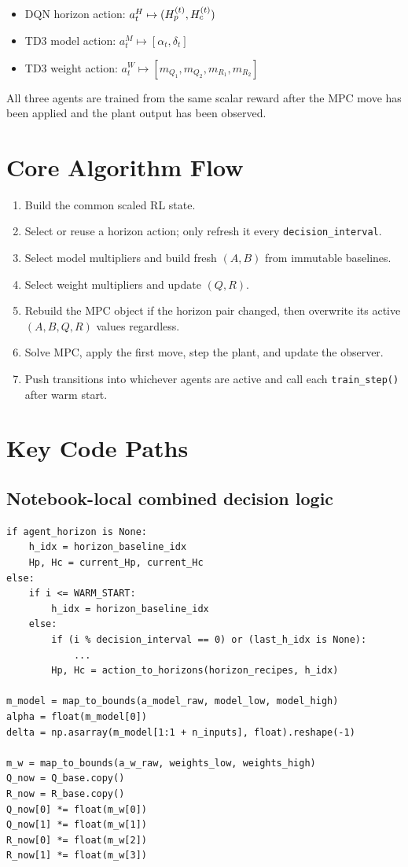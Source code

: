 \documentclass[11pt]{article}
\begin{document}
\begin{itemize}
\item DQN horizon action:
      $a_t^{H} \mapsto (H_p^{(t)},H_c^{(t)})$
\item TD3 model action:
      $a_t^{M} \mapsto [\alpha_t, \delta_t]$
\item TD3 weight action:
      $a_t^{W} \mapsto [m_{Q_1}, m_{Q_2}, m_{R_1}, m_{R_2}]$
\end{itemize}

All three agents are trained from the same scalar reward after the MPC move has
been applied and the plant output has been observed.

\section*{Core Algorithm Flow}

\begin{enumerate}
\item Build the common scaled RL state.
\item Select or reuse a horizon action; only refresh it every
      \texttt{decision\_interval}.
\item Select model multipliers and build fresh $(A, B)$ from immutable
      baselines.
\item Select weight multipliers and update $(Q, R)$.
\item Rebuild the MPC object if the horizon pair changed, then overwrite its
      active $(A, B, Q, R)$ values regardless.
\item Solve MPC, apply the first move, step the plant, and update the observer.
\item Push transitions into whichever agents are active and call each
      \texttt{train\_step()} after warm start.
\end{enumerate}

\section*{Key Code Paths}

\subsection*{Notebook-local combined decision logic}

\begin{lstlisting}
if agent_horizon is None:
    h_idx = horizon_baseline_idx
    Hp, Hc = current_Hp, current_Hc
else:
    if i <= WARM_START:
        h_idx = horizon_baseline_idx
    else:
        if (i % decision_interval == 0) or (last_h_idx is None):
            ...
        Hp, Hc = action_to_horizons(horizon_recipes, h_idx)

m_model = map_to_bounds(a_model_raw, model_low, model_high)
alpha = float(m_model[0])
delta = np.asarray(m_model[1:1 + n_inputs], float).reshape(-1)

m_w = map_to_bounds(a_w_raw, weights_low, weights_high)
Q_now = Q_base.copy()
R_now = R_base.copy()
Q_now[0] *= float(m_w[0])
Q_now[1] *= float(m_w[1])
R_now[0] *= float(m_w[2])
R_now[1] *= float(m_w[3])
\end{lstlisting}
\end{document}

